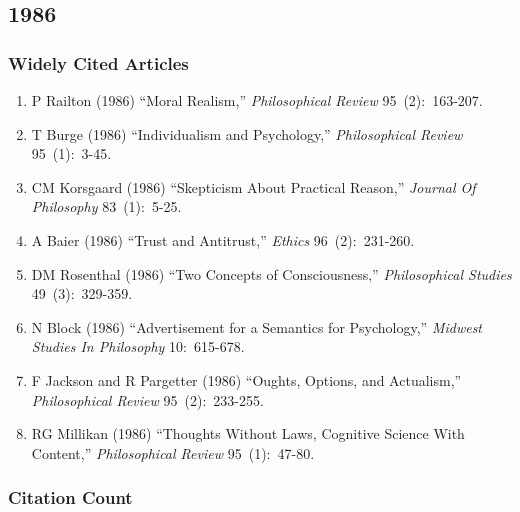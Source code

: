 \documentclass[
  10pt,
  letterpaper,
  DIV=11,
  numbers=noendperiod,
  twoside]{scrartcl}
\providecommand{\tightlist}{%
  \setlength{\itemsep}{0pt}\setlength{\parskip}{0pt}}\usepackage{longtable,booktabs,array}
\begin{document}
\newpage

\subsection{1986}\label{sec-s1986}

\subsubsection*{Widely Cited Articles}\label{widely-cited-articles-29}

\begin{enumerate}
\def\labelenumi{\arabic{enumi}.}
\tightlist
\item
  P Railton (1986) ``Moral Realism,'' \emph{Philosophical Review}
  95~(2):~163-207.
\item
  T Burge (1986) ``Individualism and Psychology,'' \emph{Philosophical
  Review} 95~(1):~3-45.
\item
  CM Korsgaard (1986) ``Skepticism About Practical Reason,''
  \emph{Journal Of Philosophy} 83~(1):~5-25.
\item
  A Baier (1986) ``Trust and Antitrust,'' \emph{Ethics} 96~(2):~231-260.
\item
  DM Rosenthal (1986) ``Two Concepts of Consciousness,''
  \emph{Philosophical Studies} 49~(3):~329-359.
\item
  N Block (1986) ``Advertisement for a Semantics for Psychology,''
  \emph{Midwest Studies In Philosophy} 10:~615-678.
\item
  F Jackson and R Pargetter (1986) ``Oughts, Options, and Actualism,''
  \emph{Philosophical Review} 95~(2):~233-255.
\item
  RG Millikan (1986) ``Thoughts Without Laws, Cognitive Science With
  Content,'' \emph{Philosophical Review} 95~(1):~47-80.
\end{enumerate}

\subsubsection*{Citation Count}\label{sec-count-1986}
\end{document}
